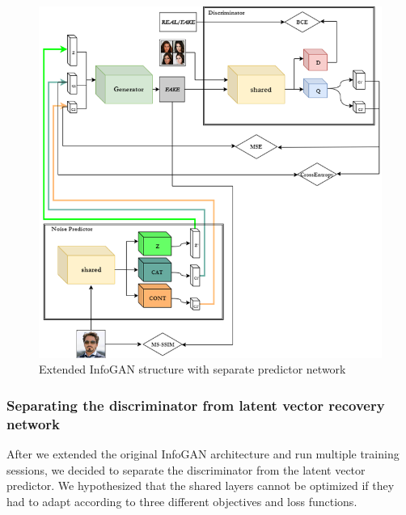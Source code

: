 \documentclass{egpubl}
\begin{document}
\begin{figure}[!htb]
	\centering
	\includegraphics[width=\linewidth]{pic/2}
	\caption{Extended InfoGAN structure with separate predictor network}
	\label{fig:infogan_noise}
\end{figure}

\subsubsection{Separating the discriminator from latent vector recovery network}

After we extended the original InfoGAN architecture and run multiple training sessions, %
we decided to separate the discriminator from the latent vector predictor. We hypothesized that the shared layers cannot be optimized if they had to adapt according to three different objectives and loss functions.
\end{document}
